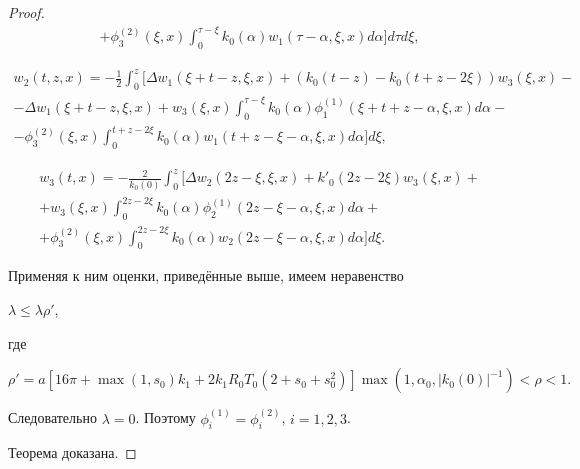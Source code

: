 \begin{proof}
\begin{multline*}
+ \phi _3^{(2)}(\xi ,x)\int_0^{\tau  - \xi } {{k_0}(\alpha )} {w_1}(\tau  - \alpha ,\xi ,x) {d\alpha } \biggr]d\tau d\xi ,

 \end{multline*}

\begin{multline*}

{w_2}(t,z,x) = - \frac 12 \int_0^z  \biggl[ \Delta {w_1}\left( {\xi  + t - z,\xi ,x} \right) + \left( {{k_0}(t - z) - {k_0}(t + z - 2\xi )}

 \right){w_3}(\xi ,x) -

\\ 

- \Delta {w_1}(\xi  + t - z,\xi ,x) + {w_3}(\xi ,x)\int_0^{\tau  - \xi } {{k_0}(\alpha )} \phi _1^{(1)}(\xi  + t + z - \alpha ,\xi ,x)d\alpha

 - 

\\

- \phi _3^{(2)}(\xi ,x)\int_0^{t + z - 2\xi } {{k_0}(\alpha )} {w_1}(t + z - \xi  - \alpha ,\xi ,x)d \alpha  \biggr]d\xi ,

\end{multline*}

\begin{multline*}

{w_3}(t,x) =  - \frac{2}{{{k_0}(0)}}\int_0^z \biggl[ \Delta {w_2}(2z - \xi ,\xi ,x) + {k'_0}(2z - 2\xi ){w_3}(\xi ,x) + 

\\

+ {w_3}\left( {\xi ,x} \right)\int_0^{2z - 2\xi } {{k_0}} (\alpha )\phi _2^{(1)}(2z - \xi  - \alpha ,\xi ,x)d\alpha  + 

\\

+\phi _3^{(2)}(\xi ,x)

\int_0^{2z - 2\xi } {{k_0}(\alpha )} {w_2}(2z - \xi  - \alpha ,\xi ,x)d \alpha  \biggr]d\xi. 

\end{multline*}



\noindent

Применяя к ним оценки, приведённые выше, имеем неравенство 

$\lambda  \leqslant \lambda \rho '$,

где 

\mbox{$\rho ' = a\left[ {16\pi  + \max (1,{s_0}){k_1} + 2{k_1}{R_0}{T_0}(2 + {s_0} + s_0^2)} \right]\max (1,{\alpha _0},{\left| {{k_0}(0)}

\right|^{ - 1}}) < \rho  < 1.$}

 Следовательно  $\lambda  = 0$.   Поэтому $\phi _i^{(1)} = \phi _i^{(2)}$, $i = 1,2,3$.

Теорема доказана. \end{proof}





